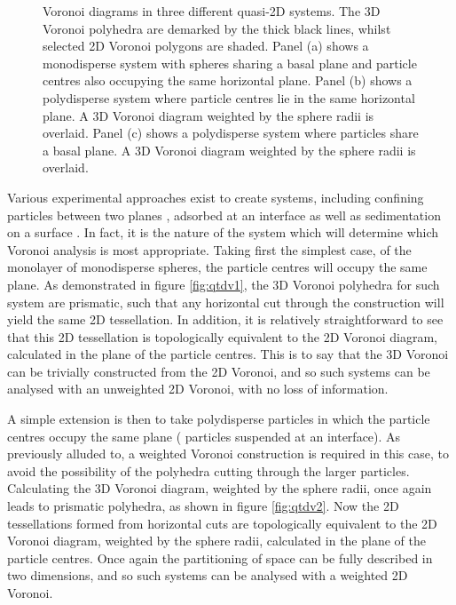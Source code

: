 \begin{figure}[tb]
	
	\caption{Voronoi diagrams in three different quasi\--2D systems. The 3D Voronoi polyhedra are demarked by the thick black lines, whilst selected 2D Voronoi polygons are shaded. Panel (a) shows a monodisperse system with spheres sharing a basal plane and particle centres also occupying the same horizontal plane. Panel (b) shows a polydisperse system where particle centres lie in the same horizontal plane. A 3D Voronoi diagram weighted by the sphere radii is overlaid. Panel (c) shows a polydisperse system where particles share a basal plane. A 3D Voronoi diagram weighted by the sphere radii is overlaid.}
	\label{fig:qtdv}
\end{figure}

Various experimental approaches exist to create \qtd{} systems, including confining particles between two planes \cite{Marcus1997,Weikai2014}, adsorbed at an interface \cite{Peng2009,Vogel2014} as well as sedimentation on a surface \cite{Tamborini2015,Thorneywork2018}.
In fact, it is the nature of the system which will determine which Voronoi analysis is most appropriate.
Taking first the simplest \qtd{} case, of the monolayer of monodisperse spheres, the particle centres will occupy the same plane.
As demonstrated in figure \ref{fig:qtdv1}, the 3D Voronoi polyhedra for such system are prismatic, such that any horizontal cut through the construction will yield the same 2D tessellation. 
In addition, it is relatively straightforward to see that this 2D tessellation is topologically equivalent to the 2D Voronoi diagram, calculated in the plane of the particle centres.
This is to say that the 3D Voronoi can be trivially constructed from the 2D Voronoi, and so such systems can be analysed with an unweighted 2D Voronoi, with no loss of information.

A simple extension is then to take polydisperse particles in which the particle centres occupy the same plane (\eg{} particles suspended at an interface).
As previously alluded to, a weighted Voronoi construction is required in this case, to avoid the possibility of the polyhedra cutting through the larger particles.
Calculating the 3D Voronoi diagram, weighted by the sphere radii, once again leads to prismatic polyhedra, as shown in figure \ref{fig:qtdv2}.
Now the 2D tessellations formed from horizontal cuts are topologically equivalent to the 2D Voronoi diagram, weighted by the sphere radii, calculated in the plane of the particle centres.
Once again the partitioning of space can be fully described in two dimensions, and so such systems can be analysed with a weighted 2D Voronoi.

